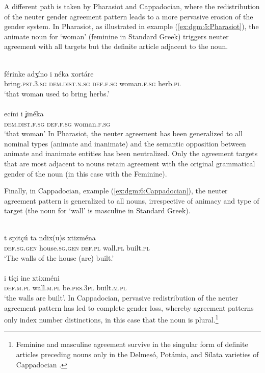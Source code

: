 \documentclass[output=collectionpaper]{langsci/langscibook}
\begin{document}
A different path is taken by Pharasiot and Cappadocian, where the redistribution of the neuter gender agreement pattern leads to a more pervasive erosion of the gender system. In Pharasiot,  as illustrated in example (\ref{ex:dgm:5:Pharasiot}), the animate noun for `woman' (feminine in Standard Greek) triggers neuter agreement with all targets but the definite article adjacent to the noun.

\ea\label{ex:dgm:5:Pharasiot}
\ea
{}\\
\gll f\'erinke adʒ\'ino i n\'eka xort\'are \\
bring.\textsc{pst.3.sg} \textsc{dem.dist.n.sg} \textsc{def.f.sg} woman.\textsc{f.sg} herb.\textsc{pl} \\
\glt `that woman used to bring herbs.'\\
\ex
{}\\
 \gll ec\'ini i ʝin\'eka \\
 \textsc{dem.dist.f.sg} \textsc{def.f.sg} woman.\textsc{f.sg} \\
 \glt `that woman'
\z
\z
In Pharasiot, the neuter agreement has been generalized to all nominal types (animate and inanimate) and the semantic opposition between animate and inanimate entities has been neutralized. Only the agreement targets that are most adjacent to nouns retain agreement with the original grammatical gender of the noun (in this case with the Feminine).

Finally, in Cappadocian, example (\ref{ex:dgm:6:Cappadocian}), the neuter agreement pattern is generalized to all nouns, irrespective of animacy and type of target (the noun for `wall' is masculine in Standard Greek).

\ea\label{ex:dgm:6:Cappadocian}
\ea
{}\\
\gll t spit\c{c}\'u ta ndix(u)s xtizm\'ena \\
\textsc{def.sg.gen} house.\textsc{sg.gen} \textsc{def.pl} wall.\textsc{pl} built.\textsc{pl} \\
\glt `The walls of the house (are) built.'\\
\ex
{}\\
\gll i t\'i\c{c}i ine xtixm\'eni \\
\textsc{def.m.pl} wall\textsc{.m.pl} be.\textsc{prs.3pl} built.\textsc{m.pl} \\
\glt `the walls are built'.
\z
\z
In Cappadocian, pervasive redistribution of the neuter agreement pattern has led to complete gender loss, whereby agreement patterns only index number distinctions, in this case that the noun is plural.\footnote{Feminine and masculine agreement survive in the singular form of definite articles preceding nouns only in the Delmes\'o, Pot\'amia, and S\'ilata varieties of Cappadocian \citep[97]{Karatsareas2014}.}
\end{document}
